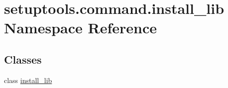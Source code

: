 \hypertarget{namespacesetuptools_1_1command_1_1install__lib}{}\section{setuptools.\+command.\+install\+\_\+lib Namespace Reference}
\label{namespacesetuptools_1_1command_1_1install__lib}
\subsection*{Classes}
\begin{DoxyCompactItemize}
\item 
class \hyperlink{classsetuptools_1_1command_1_1install__lib_1_1install__lib}{install\+\_\+lib}
\end{DoxyCompactItemize}
